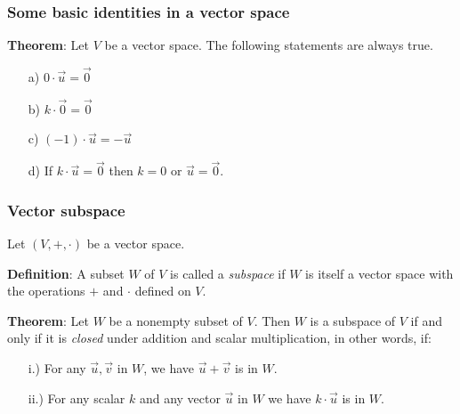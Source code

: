 \begin{frame}[fragile]
\frametitle{Some basic identities in a vector space}

\textbf{Theorem}: Let $V$ be a vector space. The following statements are always true.

\begin{itemize}
\item[a)] $\displaystyle 0 \cdot \vec{u} = \vec{0}$

\item[b)] $\displaystyle k \cdot \vec{0} = \vec{0}$

\item[c)] $\displaystyle (-1) \cdot \vec{u} = - \vec{u}$

\item[d)] If $\displaystyle k \cdot \vec{u} = \vec{0}$ then $k=0$ or $\vec{u} = \vec{0}$.

\end{itemize}

\end{frame}


\begin{frame}[fragile]
\frametitle{Vector subspace}

Let $(V, +, \cdot)$ be a vector space.



\textbf{Definition}:  A subset $W$ of $V$ is called a {\em subspace} if $W$ is itself a vector space with the operations $+$ and $\cdot$ defined on $V$.



\textbf{Theorem}: Let $W$ be a nonempty subset of $V$. Then $W$ is a subspace of $V$ if and only if it is {\em closed} under addition and scalar multiplication, in other words, if:

\begin{itemize}
\item[i.)] For any $\vec{u}, \vec{v}$ in $W$, we have $\vec{u} + \vec{v}$ is in $W$.

\item[ii.)] For any scalar $k$ and any vector $\vec{u}$ in $W$ we have $k \cdot \vec{u}$ is in $W$.
\end{itemize}
 

\end{frame}



